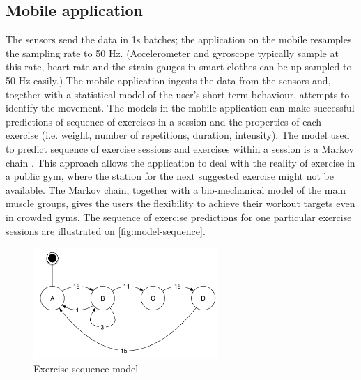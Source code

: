 \documentclass[a4paper, 10 pt, conference]{IEEEtran}
\begin{document}
\subsection{Mobile application}

The sensors send the data in 1s batches; the application on the mobile resamples the sampling rate to 50 Hz. (Accelerometer and gyroscope typically sample at this rate, heart rate and the strain gauges in smart clothes can be up-sampled to 50 Hz easily.) The mobile application ingests the data from the sensors and, together with a statistical model of the user's short-term behaviour, attempts to identify the movement. The models in the mobile application can make successful predictions of sequence of exercises in a session and the properties of each exercise (i.e. weight, number of repetitions, duration, intensity). The model used to predict sequence of exercise sessions and exercises within a session is a Markov chain \cite{markov-chain-exercise}. This approach allows the application to deal with the reality of exercise in a public gym, where the station for the next suggested exercise might not be available. The Markov chain, together with a bio-mechanical model of the main muscle groups, gives the users the flexibility to achieve their workout targets even in crowded gyms. The sequence of exercise predictions for one particular exercise sessions are illustrated on \autoref{fig:model-sequence}.

\begin{figure}[h]
	\begin{center}
		\caption{Exercise sequence model}
		\label{fig:model-sequence}
		\includegraphics[width=7cm,keepaspectratio]{ri-model-sequence.png}
	\end{center}
\end{figure}
\end{document}
